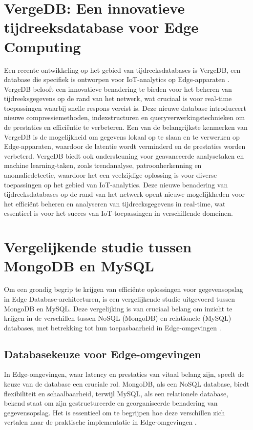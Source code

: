 \section{VergeDB: Een innovatieve tijdreeksdatabase voor Edge Computing}

Een recente ontwikkeling op het gebied van tijdreeksdatabases is VergeDB, een database die specifiek is ontworpen voor IoT-analytics op Edge-apparaten \autocite{Paparrizos2021VergeDBAD}. VergeDB belooft een innovatieve benadering te bieden voor het beheren van tijdreeksgegevens op de rand van het netwerk, wat cruciaal is voor real-time toepassingen waarbij snelle respons vereist is. Deze nieuwe database introduceert nieuwe compressiemethoden, indexstructuren en queryverwerkingstechnieken om de prestaties en efficiëntie te verbeteren. Een van de belangrijkste kenmerken van VergeDB is de mogelijkheid om gegevens lokaal op te slaan en te verwerken op Edge-apparaten, waardoor de latentie wordt verminderd en de prestaties worden verbeterd. VergeDB biedt ook ondersteuning voor geavanceerde analysetaken en machine learning-taken, zoals trendanalyse, patroonherkenning en anomaliedetectie, waardoor het een veelzijdige oplossing is voor diverse toepassingen op het gebied van IoT-analytics. Deze nieuwe benadering van tijdreeksdatabases op de rand van het netwerk opent nieuwe mogelijkheden voor het efficiënt beheren en analyseren van tijdreeksgegevens in real-time, wat essentieel is voor het succes van IoT-toepassingen in verschillende domeinen.

\section{Vergelijkende studie tussen MongoDB en MySQL}

Om een grondig begrip te krijgen van efficiënte oplossingen voor gegevensopslag in Edge Database-architecturen, is een vergelijkende studie uitgevoerd tussen MongoDB en MySQL. Deze vergelijking is van cruciaal belang om inzicht te krijgen in de verschillen tussen NoSQL (MongoDB) en relationele (MySQL) databases, met betrekking tot hun toepasbaarheid in Edge-omgevingen \autocite{Gyorodi2015comparative}.

\subsection{Databasekeuze voor Edge-omgevingen}

In Edge-omgevingen, waar latency en prestaties van vitaal belang zijn, speelt de keuze van de database een cruciale rol. MongoDB, als een NoSQL database, biedt flexibiliteit en schaalbaarheid, terwijl MySQL, als een relationele database, bekend staat om zijn gestructureerde en georganiseerde benadering van gegevensopslag. Het is essentieel om te begrijpen hoe deze verschillen zich vertalen naar de praktische implementatie in Edge-omgevingen \autocite{Gyorodi2015comparative}.

